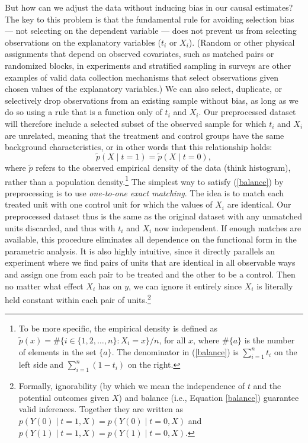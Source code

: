 \documentclass[11pt,titlepage]{article}
\begin{document}
But how can we adjust the data without inducing bias in our causal
estimates?  The key to this problem is that the fundamental rule for
avoiding selection bias --- not selecting on the dependent variable
--- does not prevent us from selecting observations on the explanatory
variables ($t_i$ or $X_i$).  (Random or other physical assignments
that depend on observed covariates, such as matched pairs or
randomized blocks, in experiments and stratified sampling in surveys
are other examples of valid data collection mechanisms that select
observations given chosen values of the explanatory variables.)  We
can also select, duplicate, or selectively drop observations from an
existing sample without bias, as long as we do so using a rule that is
a function only of $t_i$ and $X_i$.  Our preprocessed dataset will
therefore include a selected subset of the observed sample for which
$t_i$ and $X_i$ are unrelated, meaning that the treatment and control
groups have the same background characteristics, or in other words
that this relationship holds:
\begin{equation}
  \label{balance}
  \tilde p(X\mid t=1) = \tilde p(X\mid t=0),
\end{equation}
where $\tilde p$ refers to the observed empirical density of the data
(think histogram), rather than a population density.\footnote{To be
  more specific, the empirical density is defined as $\tilde p(x) = \#
  \{ i\in \{1, 2, \dots, n \}: X_i = x \} / n$, for all $x$, where
  $\#\{a\}$ is the number of elements in the set $\{a\}$.  The
  denominator in (\ref{balance}) is $\sum_{i=1}^n t_i$ on the left
  side and $\sum_{i=1}^n (1-t_i)$ on the right.}  The simplest way to
satisfy (\ref{balance}) by preprocessing is to use \emph{one-to-one
  exact matching}.  The idea is to match each treated unit with one
control unit for which the values of $X_i$ are identical.  Our
preprocessed dataset thus is the same as the original dataset with any
unmatched units discarded, and thus with $t_i$ and $X_i$ now
independent.  If enough matches are available, this procedure
eliminates all dependence on the functional form in the parametric
analysis.  It is also highly intuitive, since it directly parallels an
experiment where we find pairs of units that are identical in all
observable ways and assign one from each pair to be treated and the
other to be a control.  Then no matter what effect $X_i$ has on $y$,
we can ignore it entirely since $X_i$ is literally held constant
within each pair of units.\footnote{Formally, ignorability (by which
  we mean the independence of $t$ and the potential outcomes given
  $X$) and balance (i.e., Equation \ref{balance}) guarantee valid
  inferences. Together they are written as $p(Y(0)\mid
  t=1,X)=p(Y(0)\mid t=0,X)$ and $p(Y(1)\mid t=1,X)=p(Y(1)\mid
  t=0,X)$.}
\end{document}
